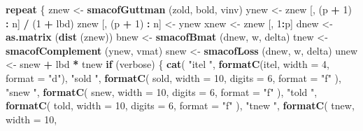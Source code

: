 \documentclass[
  12pt,
]{article}
\newenvironment{Shaded}{\begin{snugshade}}{\end{snugshade}}
\newcommand{\AttributeTok}[1]{\textcolor[rgb]{0.13,0.29,0.53}{#1}}
\newcommand{\ControlFlowTok}[1]{\textcolor[rgb]{0.13,0.29,0.53}{\textbf{#1}}}
\newcommand{\DecValTok}[1]{\textcolor[rgb]{0.00,0.00,0.81}{#1}}
\newcommand{\FunctionTok}[1]{\textcolor[rgb]{0.13,0.29,0.53}{\textbf{#1}}}
\newcommand{\NormalTok}[1]{#1}
\newcommand{\OtherTok}[1]{\textcolor[rgb]{0.56,0.35,0.01}{#1}}
\newcommand{\SpecialCharTok}[1]{\textcolor[rgb]{0.81,0.36,0.00}{\textbf{#1}}}
\newcommand{\StringTok}[1]{\textcolor[rgb]{0.31,0.60,0.02}{#1}}
\begin{document}
\begin{Shaded}
\begin{Highlighting}[]
    \ControlFlowTok{repeat}\NormalTok{ \{}
\NormalTok{      znew }\OtherTok{\textless{}{-}} \FunctionTok{smacofGuttman}\NormalTok{ (zold, bold, vinv)}
\NormalTok{      ynew }\OtherTok{\textless{}{-}}\NormalTok{ znew [, (p }\SpecialCharTok{+} \DecValTok{1}\NormalTok{) }\SpecialCharTok{:}\NormalTok{ n] }\SpecialCharTok{/}\NormalTok{ (}\DecValTok{1} \SpecialCharTok{+}\NormalTok{ lbd)}
\NormalTok{      znew [, (p }\SpecialCharTok{+} \DecValTok{1}\NormalTok{) }\SpecialCharTok{:}\NormalTok{ n] }\OtherTok{\textless{}{-}}\NormalTok{ ynew}
\NormalTok{      xnew }\OtherTok{\textless{}{-}}\NormalTok{ znew [, }\DecValTok{1}\SpecialCharTok{:}\NormalTok{p]}
\NormalTok{      dnew }\OtherTok{\textless{}{-}} \FunctionTok{as.matrix}\NormalTok{ (}\FunctionTok{dist}\NormalTok{ (znew))}
\NormalTok{      bnew }\OtherTok{\textless{}{-}} \FunctionTok{smacofBmat}\NormalTok{ (dnew, w, delta)}
\NormalTok{      tnew }\OtherTok{\textless{}{-}} \FunctionTok{smacofComplement}\NormalTok{ (ynew, vmat)}
\NormalTok{      snew }\OtherTok{\textless{}{-}} \FunctionTok{smacofLoss}\NormalTok{ (dnew, w, delta) }
\NormalTok{      unew }\OtherTok{\textless{}{-}}\NormalTok{ snew }\SpecialCharTok{+}\NormalTok{ lbd }\SpecialCharTok{*}\NormalTok{ tnew }
      \ControlFlowTok{if}\NormalTok{ (verbose) \{}
        \FunctionTok{cat}\NormalTok{(}
          \StringTok{"itel "}\NormalTok{,}
          \FunctionTok{formatC}\NormalTok{(itel, }\AttributeTok{width =} \DecValTok{4}\NormalTok{, }\AttributeTok{format =} \StringTok{"d"}\NormalTok{),}
          \StringTok{"sold "}\NormalTok{,}
          \FunctionTok{formatC}\NormalTok{(}
\NormalTok{            sold,}
            \AttributeTok{width =} \DecValTok{10}\NormalTok{,}
            \AttributeTok{digits =} \DecValTok{6}\NormalTok{,}
            \AttributeTok{format =} \StringTok{"f"}
\NormalTok{          ),}
          \StringTok{"snew "}\NormalTok{,}
          \FunctionTok{formatC}\NormalTok{(}
\NormalTok{            snew,}
            \AttributeTok{width =} \DecValTok{10}\NormalTok{,}
            \AttributeTok{digits =} \DecValTok{6}\NormalTok{,}
            \AttributeTok{format =} \StringTok{"f"}
\NormalTok{          ),}
          \StringTok{"told "}\NormalTok{,}
          \FunctionTok{formatC}\NormalTok{(}
\NormalTok{            told,}
            \AttributeTok{width =} \DecValTok{10}\NormalTok{,}
            \AttributeTok{digits =} \DecValTok{6}\NormalTok{,}
            \AttributeTok{format =} \StringTok{"f"}
\NormalTok{          ),}
          \StringTok{"tnew "}\NormalTok{,}
          \FunctionTok{formatC}\NormalTok{(}
\NormalTok{            tnew,}
            \AttributeTok{width =} \DecValTok{10}\NormalTok{,}

\end{Highlighting}
\end{Shaded}
\end{document}
